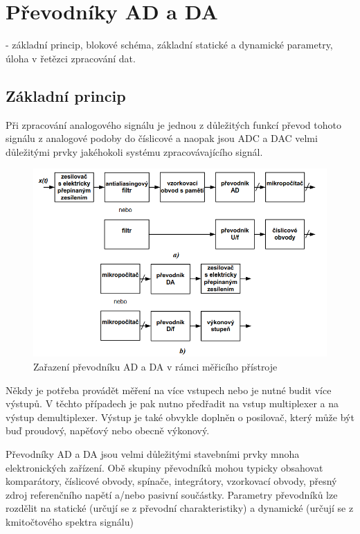 \section{Převodníky AD a DA}
- základní princip, blokové schéma, základní statické a dynamické parametry, úloha v řetězci zpracování dat.

\subsection{Základní princip}
Při zpracování analogového signálu je jednou z důležitých funkcí převod tohoto signálu z analogové podoby do číslicové a naopak jsou ADC a DAC velmi důležitými prvky jakéhokoli systému zpracovávajícího signál.
   \begin{figure}[h]
   \begin{center}
     \includegraphics[scale=0.6]{images/ADCDAC.png}
   \end{center}
   \caption{Zařazení převodníku AD a DA v rámci měřicího přístroje}
  \end{figure}
  
Někdy je potřeba provádět měření na více vstupech nebo je nutné budit více výstupů. V těchto případech je pak nutno předřadit na vstup multiplexer a na výstup demultiplexer. 
Výstup je také obvykle doplněn o posilovač, který může být buď proudový, napěťový nebo obecně výkonový.  

Převodníky AD a DA jsou velmi důležitými stavebními prvky mnoha elektronických
zařízení. Obě skupiny převodníků mohou typicky obsahovat komparátory, číslicové obvody,
spínače, integrátory, vzorkovací obvody, přesný zdroj referenčního napětí a/nebo pasivní
součástky. Parametry převodníků lze rozdělit na statické (určují se z převodní charakteristiky)
a dynamické (určují se z kmitočtového spektra signálu)
\newpage

